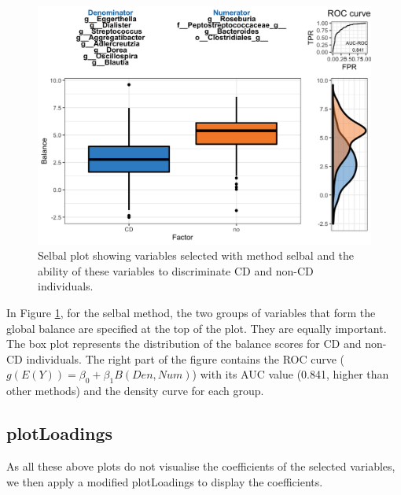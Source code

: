 \documentclass[openany]{book}
\newenvironment{Shaded}{\begin{snugshade}}{\end{snugshade}}
\newcommand{\KeywordTok}[1]{\textcolor[rgb]{0.13,0.29,0.53}{\textbf{#1}}}
\newcommand{\DataTypeTok}[1]{\textcolor[rgb]{0.13,0.29,0.53}{#1}}
\newcommand{\StringTok}[1]{\textcolor[rgb]{0.31,0.60,0.02}{#1}}
\newcommand{\CommentTok}[1]{\textcolor[rgb]{0.56,0.35,0.01}{\textit{#1}}}
\newcommand{\OperatorTok}[1]{\textcolor[rgb]{0.81,0.36,0.00}{\textbf{#1}}}
\newcommand{\NormalTok}[1]{#1}
\begin{document}
\begin{figure}

{\centering \includegraphics[width=1\linewidth]{./Generated_plots/selbalCD-1} 

}

\caption{Selbal plot showing variables selected with method selbal and the ability of these variables to discriminate CD and non-CD individuals.}\label{fig:selbalCD}
\end{figure}

In Figure \ref{fig:selbalCD}, for the selbal method, the two groups of
variables that form the global balance are specified at the top of the
plot. They are equally important. The box plot represents the
distribution of the balance scores for CD and non-CD individuals. The
right part of the figure contains the ROC curve
(\(g(E(Y)) = \beta_{0} + \beta_{1}B(Den,Num)\)) with its AUC value
(0.841, higher than other methods) and the density curve for each group.

\subsection{plotLoadings}\label{plotloadings}

As all these above plots do not visualise the coefficients of the
selected variables, we then apply a modified plotLoadings
\citep{rohart2017mint} to display the coefficients.

\begin{Shaded}
\end{Shaded}
\end{document}
